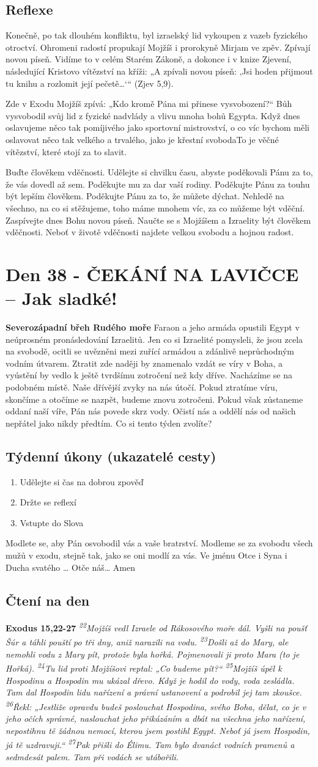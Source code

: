 \documentclass[11pt]{article}
\newcommand{\zacatekSestyTyden}{
  \textbf{Severozápadní břeh Rudého moře} \newline 
  Faraon a jeho armáda opustili Egypt v neúprosném pronásledování Izraelitů. Jen co si Izraelité pomysleli, že jsou zcela na svobodě, ocitli se uvězněni mezi zuřící armádou a zdánlivě neprůchodným vodním útvarem. Ztratit zde naději by znamenalo vzdát se víry v Boha, a vyústění by vedlo k ještě tvrdšímu zotročení než kdy dříve. Nacházíme se na podobném místě. Naše dřívější zvyky na nás útočí. Pokud ztratíme víru, skončíme a otočíme se nazpět, budeme znovu zotročeni. Pokud však zůstaneme oddaní naší víře, Pán nás povede skrz vody. Očistí nás a oddělí nás od našich nepřátel jako nikdy předtím. Co si tento týden zvolíte?

\subsection*{Týdenní úkony (ukazatelé cesty)}
\begin{enumerate}
  \item Udělejte si čas na dobrou zpověď
  \item Držte se reflexí
  \item Vstupte do Slova
\end{enumerate}
Modlete se, aby Pán osvobodil vás a vaše bratrství. \newline
Modleme se za svobodu všech mužů v exodu, stejně tak, jako se oni modlí za vás.\newline
Ve jménu Otce i Syna i Ducha svatého …  Otče náš… Amen
}
\begin{document}
\subsection*{Reflexe}
Konečně, po tak dlouhém konfliktu, byl izraelský lid vykoupen z vazeb fyzického otroctví. Ohromeni radostí propukají Mojžíš i
prorokyně Mirjam ve zpěv. Zpívají novou píseň. Vidíme to v celém Starém Zákoně, a dokonce i v knize Zjevení, následující
Kristovo vítězství na kříži: „A zpívali novou píseň: ‚Jsi hoden přijmout tu knihu a rozlomit její pečetě…‘“ (Zjev 5,9).

Zde v Exodu Mojžíš zpívá: „Kdo kromě Pána mi přinese vysvobození?“ Bůh vysvobodil svůj lid z fyzické nadvlády a vlivu mnoha
bohů Egypta. Když dnes oslavujeme něco tak pomíjivého jako sportovní mistrovství, o co víc bychom měli oslavovat něco tak
velkého a trvalého, jako je křestní svobodaTo je věčné vítězství, které stojí za to slavit.

Buďte člověkem vděčnosti. Udělejte si chvilku času, abyste poděkovali Pánu za to, že vás dovedl až sem. Poděkujte mu za dar vaší
rodiny. Poděkujte Pánu za touhu být lepším člověkem. Poděkujte Pánu za to, že můžete dýchat. Nehledě na všechno, na co si
stěžujeme, toho máme mnohem víc, za co můžeme být vděční. Zaspívejte dnes Bohu novou píseň. Naučte se s Mojžíšem a
Izraelity být člověkem vděčnosti. Neboť v životě vděčnosti najdete velkou svobodu a hojnou radost.


\newpage
\section{Den 38 - ČEKÁNÍ NA LAVIČCE – Jak sladké!}
\zacatekSestyTyden
\subsection*{Čtení na den}
\textbf{Exodus 15,22-27}
\newline
\textit{
\textsuperscript{22}Mojžíš vedl Izraele od Rákosového moře dál. Vyšli na poušť Šúr a táhli pouští po tři dny, aniž narazili na vodu.
\textsuperscript{23}Došli až do Mary, ale nemohli vodu z Mary pít, protože byla hořká. Pojmenovali ji proto Mara (to je Hořká).
\textsuperscript{24}Tu lid proti Mojžíšovi reptal: „Co budeme pít?“
\textsuperscript{25}Mojžíš úpěl k Hospodinu a Hospodin mu ukázal dřevo. Když je hodil do vody, voda zesládla. Tam dal Hospodin lidu nařízení a právní ustanovení a podrobil jej tam zkoušce.
\textsuperscript{26}Řekl: „Jestliže opravdu budeš poslouchat Hospodina, svého Boha, dělat, co je v jeho očích správné, naslouchat jeho přikázáním a dbát na všechna jeho nařízení, nepostihnu tě žádnou nemocí, kterou jsem postihl Egypt. Neboť já jsem Hospodin, já tě uzdravuji.“
\textsuperscript{27}Pak přišli do Élimu. Tam bylo dvanáct vodních pramenů a sedmdesát palem. Tam při vodách se utábořili.
}
\end{document}
